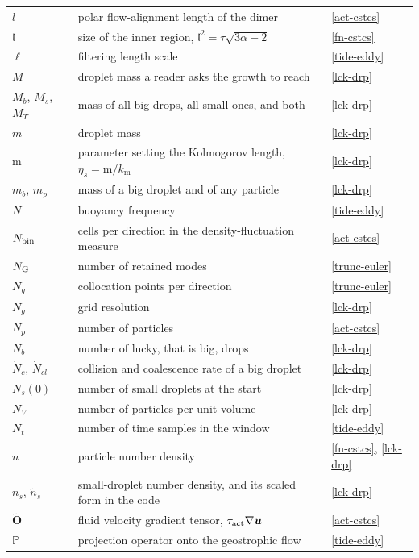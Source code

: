 \begin{longtable}{@{}p{}p{}p{}@{}}
$l$ & polar flow-alignment length of the dimer & \ref{act-cstcs} \\
$\mathfrak{l}$ & size of the inner region, $\mathfrak{l}^2 = \tau\sqrt{3\alpha-2}$ & \ref{fn-cstcs} \\
$\ell$ & filtering length scale & \ref{tide-eddy} \\
\addlinespace
$M$ & droplet mass a reader asks the growth to reach & \ref{lck-drp} \\
$M_b$, $M_s$, $M_T$ & mass of all big drops, all small ones, and both & \ref{lck-drp} \\
$m$ & droplet mass & \ref{lck-drp} \\
$\mathrm{m}$ & parameter setting the Kolmogorov length, $\eta_s = \mathrm{m}/k_{\mathrm{m}}$ & \ref{lck-drp} \\
$m_b$, $m_p$ & mass of a big droplet and of any particle & \ref{lck-drp} \\
\addlinespace
$N$ & buoyancy frequency & \ref{tide-eddy} \\
$N_{\rm bin}$ & cells per direction in the density-fluctuation measure & \ref{act-cstcs} \\
$N_{\rm G}$ & number of retained modes & \ref{trunc-euler} \\
$N_g$ & collocation points per direction & \ref{trunc-euler} \\
$N_g$ & grid resolution & \ref{lck-drp} \\
$N_p$ & number of particles & \ref{act-cstcs} \\
$N_b$ & number of lucky, that is big, drops & \ref{lck-drp} \\
$\dot{N}_c$, $\dot{N}_{cl}$ & collision and coalescence rate of a big droplet & \ref{lck-drp} \\
$N_s(0)$ & number of small droplets at the start & \ref{lck-drp} \\
$N_V$ & number of particles per unit volume & \ref{lck-drp} \\
$N_t$ & number of time samples in the window & \ref{tide-eddy} \\
$n$ & particle number density & \ref{fn-cstcs}, \ref{lck-drp} \\
$n_s$, $\tilde{n}_s$ & small-droplet number density, and its scaled form in the code & \ref{lck-drp} \\
\addlinespace
$\tilde{\mathbf{O}}$ & fluid velocity gradient tensor, $\tau_{\rm act}\nabla\boldsymbol{u}$ & \ref{act-cstcs} \\
\addlinespace
$\mathbb{P}$ & projection operator onto the geostrophic flow & \ref{tide-eddy} \\

\end{longtable}
